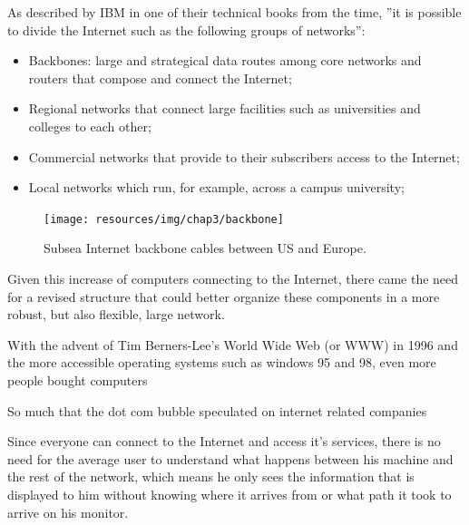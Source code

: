 	As described by IBM in one of their technical books from the time, ''it is possible to divide the Internet such as the following groups of networks''\cite{gg243376}:
	\begin{itemize}[noitemsep]
		\item Backbones: large and strategical data routes among core networks and routers that compose and connect the Internet;
		\item Regional networks that connect large facilities such as universities and colleges to each other;
		\item Commercial networks that provide to their subscribers access to the Internet;
		\item Local networks which run, for example, across a campus university;
	\end{itemize}

	\begin{figure}
		\centering
		\texttt{[image: resources/img/chap3/backbone]}
		\caption[Subsea Internet backbone cables between US and Europe.]{Subsea Internet backbone cables between US and Europe. \footnotemark}
	\end{figure}

	Given this increase of computers connecting to the Internet, there came the need for a revised structure that could better organize these components in a more robust, but also flexible, large network.

	With the advent of Tim Berners-Lee's World Wide Web (or WWW) in 1996 and the more accessible operating systems such as windows 95 and 98, even more people bought computers
	
	So much that the dot com bubble speculated on internet related companies

	Since everyone can connect to the Internet and access it's services, there is no need for the average user to understand what happens between his machine and the rest of the network, which means he only sees the information that is displayed to him without knowing where it arrives from or what path it took to arrive on his monitor.

	
	
	
	
	\vspace{5cm}
	
